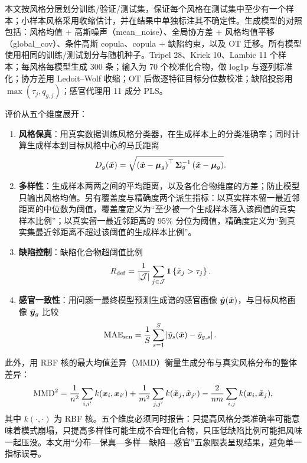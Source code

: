 本文按风格分层划分训练/验证/测试集，保证每个风格在测试集中至少有一个样本；小样本风格采用收缩估计，并在结果中单独标注其不确定性。生成模型的对照包括：风格均值 + 高斯噪声（mean\_noise）、全局协方差 + 风格均值平移（global\_cov）、条件高斯 copula、copula + 缺陷约束，以及 OT 迁移。所有模型使用相同的训练/测试划分与随机种子。Tripel 28、Kriek 10、Lambic 11 个样本；每风格每模型生成 300 条；输入为 70 个校准化合物，做 log1p 与逐列标准化；协方差用 Ledoit--Wolf 收缩；OT 后做逐特征目标分位数校准；缺陷投影用 $\max(\tau_j,q_{g,j})$；感官代理用 11 成分 PLS。

评价从五个维度展开：

\begin{enumerate}
  \item \textbf{风格保真}：用真实数据训练风格分类器，在生成样本上的分类准确率；同时计算生成样本到目标风格中心的马氏距离
  \begin{equation}
    D_g(\tilde{\bm{x}})=\sqrt{\left(\tilde{\bm{x}}-\bm{\mu}_g\right)^\top
    \bm{\Sigma}_g^{-1}\left(\tilde{\bm{x}}-\bm{\mu}_g\right)}.
    \label{eq:q3-mahalanobis}
  \end{equation}
  \item \textbf{多样性}：生成样本两两之间的平均距离，以及各化合物维度的方差；防止模型只输出风格均值。另有覆盖度与精确度两个派生指标：以真实样本留一最近邻距离的中位数为阈值，覆盖度定义为“至少被一个生成样本落入该阈值的真实样本比例”；以真实留一最近邻距离的 95\% 分位为阈值，精确度定义为“到真实集最近邻距离不超过该阈值的生成样本比例”。
  \item \textbf{缺陷控制}：缺陷化合物超阈值比例
  \begin{equation}
    R_{\mathrm{def}}=\frac{1}{\left\lvert \mathcal{J} \right\rvert}
    \sum_{j\in\mathcal{J}}\mathbf{1}\left\{\tilde{x}_j>\tau_j\right\}.
    \label{eq:q3-defect-rate}
  \end{equation}
  \item \textbf{感官一致性}：用问题一最终模型预测生成谱的感官画像 $\hat{\bm{y}}(\tilde{\bm{x}})$，与目标风格画像 $\bar{\bm{y}}_g$ 比较
  \begin{equation}
    \mathrm{MAE}_{\mathrm{sen}}=\frac{1}{S}\sum_{s=1}^{S}
    \left\lvert \hat{y}_s(\tilde{\bm{x}})-\bar{y}_{g,s} \right\rvert.
    \label{eq:q3-sensory}
  \end{equation}
\end{enumerate}

此外，用 RBF 核的最大均值差异（MMD）衡量生成分布与真实风格分布的整体差异：
\begin{equation}
  \mathrm{MMD}^2=
  \frac{1}{n^2}\sum_{i,i'}k(\bm{x}_i,\bm{x}_{i'})
  +\frac{1}{m^2}\sum_{j,j'}k(\tilde{\bm{x}}_j,\tilde{\bm{x}}_{j'})
  -\frac{2}{nm}\sum_{i,j}k(\bm{x}_i,\tilde{\bm{x}}_j),
  \label{eq:q3-mmd}
\end{equation}
其中 $k(\cdot,\cdot)$ 为 RBF 核。五个维度必须同时报告：只提高风格分类准确率可能意味着模式崩塌，只提高多样性可能生成不合理化合物，只压低缺陷比例可能把风味一起压没。本文用“分布—保真—多样—缺陷—感官”五象限表呈现结果，避免单一指标误导。

